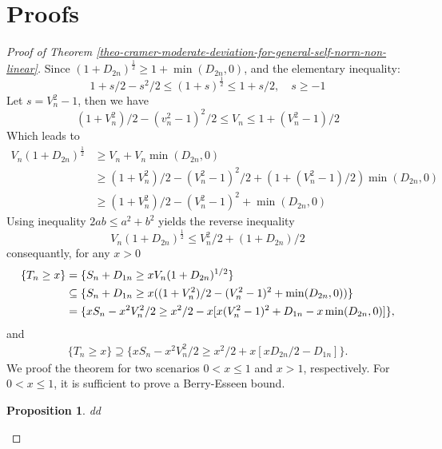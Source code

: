 \documentclass[bj,authoryear]{imsart}
\numberwithin{equation}{section}
\theoremstyle{plain}
\newtheorem{prop}{Proposition}[section]
\theoremstyle{definition}
\begin{document}
\section{Proofs}

\begin{proof}[Proof of Theorem \ref{theo-cramer-moderate-deviation-for-general-self-norm-non-linear}]
Since $(1+D_{2n})^{\frac{1}{2}}\geq 1+\min(D_{2n}, 0)$, and the elementary inequality:
\begin{equation}
  1+s/2-s^2/2\leq (1+s)^{\frac{1}{2}}\leq 1+s/2,\quad s\geq -1
\end{equation}
Let $s = V_{n}^{2}-1$, then we have 
\begin{equation}
  (1+V_{n}^{2})/2-(v_{n}^{2}-1)^2/2\leq V_n\leq 1+(V_{n}^{2}-1)/2
\end{equation}
Which leads to
\begin{equation}
  \begin{aligned}
    V_n(1+D_{2n})^{\frac{1}{2}}& \geq V_n+V_n \min(D_{2n}, 0)\\
    &\geq (1+V_{n}^{2})/2-(V_{n}^{2}-1)^2/2+(1+(V_{n}^{2}-1)/2)\min(D_{2n}, 0)\\
    &\geq (1+V_{n}^{2})/2-(V_{n}^{2}-1)^2+\min(D_{2n}, 0)
  \end{aligned}
\end{equation}
Using inequality $2ab\leq a^2+b^2$ yields the reverse inequality
\begin{equation}
  V_{n}(1+D_{2n})^{\frac{1}{2}}\leq V_{n}^{2}/2+(1+D_{2n})/2
\end{equation}
consequantly, for any $x>0$
\begin{align}\label{biggerset}
  \{T_n\geq x\}& = \{S_n+D_{1n}\geq xV_n(1+D_{2n})^{1/2}\}\notag\\
  &\subseteq \{S_n+D_{1n}\geq x((1+V_{n}^{2})/2-(V_{n}^{2}-1)^2+\min(D_{2n},0))\}\notag\\
  &= \{xS_n-x^2V_{n}^{2}/2\geq x^2/2-x[x(V_{n}^{2}-1)^2+D_{1n}-x\min(D_{2n},0)]\},
\end{align}
and 
\begin{align}
  \{T_n\geq x\}\supseteq\{xS_n-x^2V_{n}^{2}/2\geq x^2/2+x[xD_{2n}/2-D_{1n}]\}.\label{smallset}
\end{align}
We proof the theorem for two scenarios $0<x\leq 1$ and $x>1$, respectively. For $0<x \leq 1$, it is sufficient to prove a Berry-Esseen bound.

\begin{prop}\label{prop-0-x-1-Berry-Esseen}
  dd
\end{prop}


\end{proof}
\end{document}
